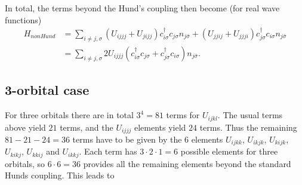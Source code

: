 \documentclass[12pt,a4paper]{scrartcl}
\numberwithin{equation}{section}
\begin{document}
In total, the terms beyond the Hund's coupling then become (for real wave functions)
\begin{align}
 H_{nonHund} 
 &= \sum_{i\neq j,\sigma} (U_{ijjj}+U_{jijj})c^{\dagger}_{i\sigma}  c_{j\sigma} n_{j\bar{\sigma}}
                        + (U_{jjij}+U_{jjji})c^{\dagger}_{j\sigma} c_{i\sigma}  n_{j\bar{\sigma}}\\
%
 &= \sum_{i\neq j,\sigma} 2U_{ijjj} ( c^{\dagger}_{i\sigma}  c_{j\sigma} + c^{\dagger}_{j\sigma} c_{i\sigma} )n_{j\bar{\sigma}}.
\end{align}

\subsection{3-orbital case}
For three orbitals there are in total $3^4=81$ terms for $U_{ijkl}$. The usual terms above yield $21$ terms, 
and the $U_{ijjj}$ elements yield $24$ terms.
Thus the remaining $81-21-24=36$ terms have to be given by the $6$ elements $U_{ijkk}$, $U_{ikjk}$, $U_{kijk}$,
$U_{kikj}$, $U_{kkij}$ and $U_{ikkj}$. Each term has $3\cdot 2 \cdot 1=6$ possible elements for three orbitals,
so $6\cdot 6=36$ provides all the remaining elements beyond the standard Hunds coupling.
This leads to
\end{document}
